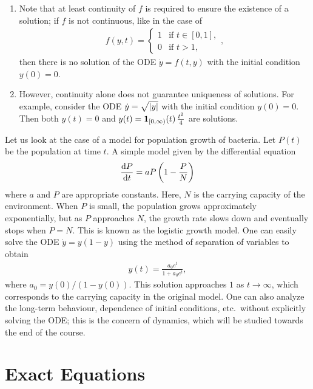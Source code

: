 \begin{enumerate}[label=(\roman*)]
    \item Note that at least continuity of $f$ is required to ensure the existence of a solution; if $f$ is not continuous, like in the case of
    \begin{align}
        f(y,t) = \begin{cases}
            1 &\text{if } t \in [0,1], \\
            0 & \text{if } t > 1,
        \end{cases},
    \end{align}
    then there is no solution of the ODE $\dot{y} = f(t,y)$ with the initial condition $y(0) = 0$.
    \item However, continuity alone does not guarantee uniqueness of solutions. For example, consider the ODE $\dot{y} = \sqrt{\left| y \right|}$ with the initial condition $y(0) = 0$. Then both $y(t) = 0$ and $y(t) = \textbf{1}_{[0,\infty)}(t) \, \frac{t^{2}}{4}$ are solutions.
\end{enumerate}

\begin{example}
    Let us look at the case of a model for population growth of bacteria. Let $P(t)$ be the population at time $t$. A simple model given by the differential equation
    \begin{align}
        \frac{\mathrm{d}P}{\mathrm{d}t} = aP \left( 1 - \frac{P}{N} \right)
    \end{align}
    where $a$ and $P$ are appropriate constants. Here, $N$ is the carrying capacity of the environment. When $P$ is small, the population grows approximately exponentially, but as $P$ approaches $N$, the growth rate slows down and eventually stops when $P = N$. This is known as the logistic growth model. One can easily solve the ODE $\dot{y} = y(1-y)$ using the method of separation of variables to obtain
    \begin{align}
        y(t) = \frac{a_{0} e^{t}}{1 + a_{0} e^{t}},
    \end{align}
    where $a_{0} = y(0) / (1 - y(0))$. This solution approaches $1$ as $t \to \infty$, which corresponds to the carrying capacity in the original model. One can also analyze the long-term behaviour, dependence of initial conditions, etc.~without explicitly solving the ODE; this is the concern of dynamics, which will be studied towards the end of the course.
\end{example}

\section{Exact Equations}

